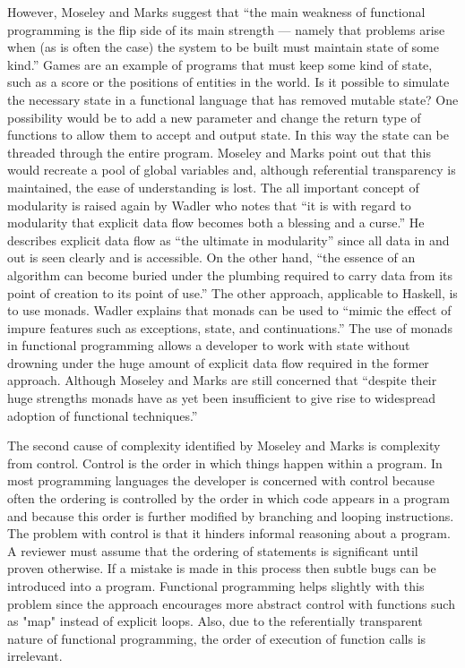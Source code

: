 However, Moseley and Marks suggest that ``the main weakness of functional programming
is the flip side of its main strength --- namely that problems arise when (as is often the
case) the system to be built must maintain state of some kind.'' Games are an
example of programs that must keep some kind of state, such as a score or the
positions of entities in the world. Is it possible to simulate the necessary state
in a functional language that has removed mutable state? One possibility would be
to add a new parameter and change the return type of functions to allow them to
accept and output state. In this way the state can be threaded through the entire
program. Moseley and Marks point out that this would recreate a pool of global
variables and, although referential transparency is maintained, the ease of understanding
is lost. The all important concept of modularity is raised again by Wadler who
notes that ``it is with regard to modularity that explicit data flow becomes both
a blessing and a curse.''\cite{wadler1995monads} He describes explicit data flow
as ``the ultimate in modularity'' since all data in and out is seen clearly and is
accessible. On the other hand, ``the essence of an algorithm can become buried under
the plumbing required to carry data from its point of creation to its point of use.''
The other approach, applicable to Haskell, is to use monads. Wadler explains that
monads can be used to ``mimic the effect of impure features such as exceptions,
state, and continuations.''\cite{wadler1992essence} The use of monads in functional
programming allows a developer to work with state without drowning under the huge
amount of explicit data flow required in the former approach. Although Moseley and Marks
are still concerned that ``despite their huge strengths monads have as yet been
insufficient to give rise to widespread adoption of functional techniques.''

The second cause of complexity identified by Moseley and Marks is complexity
from control. Control is the order in which things happen within a program.
In most programming languages the developer is concerned with control because
often the ordering is controlled by the order in which code appears in a program
and because this order is further modified by branching and looping instructions.
The problem with control is that it hinders informal reasoning about a program.
A reviewer must assume that the ordering of statements is significant until
proven otherwise. If a mistake is made in this process then subtle bugs can
be introduced into a program. Functional programming helps slightly with this
problem since the approach encourages more abstract control with functions
such as "map" instead of explicit loops. Also, due to the referentially transparent
nature of functional programming, the order of execution of function calls
is irrelevant.\cite[-3em]{hughes1989whyfp}\cite[1em]{wadler1995monads}

